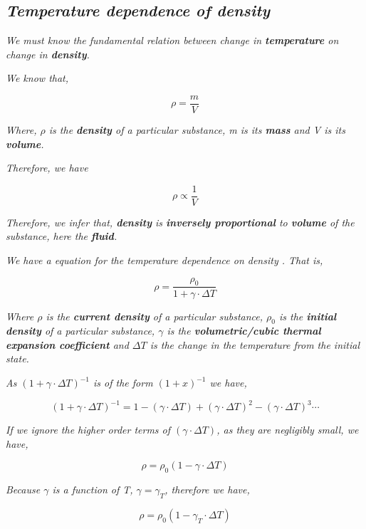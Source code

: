 \subsection{\textit{Temperature dependence of density}}
            
	\textit{We must know the fundamental relation between change in \textbf{temperature} on change in \textbf{density}.}
            
    \textit{We know that,}
    
    		$$\rho = \frac{m}{V}$$
            
	\textit{Where, $\rho$ is the \textbf{density} of a particular substance, m is its \textbf{mass} and V is its \textbf{volume}.}            
          
	\textit{Therefore, we have}          
            
		$$\rho \propto \frac{1}{V}$$            
            
	\textit{Therefore, we infer that, \textbf{density} is \textbf{inversely proportional} to \textbf{volume} of the substance, here the \textbf{fluid}.}            
            
	\textit{We have a equation for the temperature dependence on density \cite{0}. That is,}            
            
		$$\rho = \frac{\rho_{0}}{1 + \gamma\cdot\Delta T}$$            

	\textit{Where $\rho$ is the \textbf{current density} of a particular substance, $\rho_{0}$ is the \textbf{initial density} of a particular substance, $\gamma$ is the \textbf{volumetric/cubic thermal expansion coefficient} and $\Delta T$ is the change in the temperature from the initial state.}            

	\textit{As $\left(1 + \gamma\cdot\Delta T\right)^{-1}$ is of the form $\left(1 + x\right)^{-1}$ we have,}
	
		$$\left(1 + \gamma\cdot\Delta T\right)^{-1} = 1 - \left(\gamma\cdot\Delta T\right) + \left(\gamma\cdot\Delta T\right)^2 - \left(\gamma\cdot\Delta T\right)^3 \cdots$$

	\textit{If we ignore the higher order terms of $\left(\gamma\cdot\Delta T\right)$, as they are negligibly small, we have,}
            
		$$\rho = \rho_{0}\left(1 - \gamma\cdot\Delta T\right)$$            

	\textit{Because $\gamma$ is a function of T, $\gamma = \gamma_{T}$, therefore we have,}

		$$\rho = \rho_{0}\left(1 - \gamma_{T}\cdot\Delta T\right)$$
            
